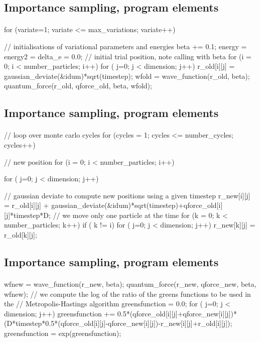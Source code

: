 \documentclass[%
twoside,                 %
final,                   %
10pt]{article}
\begin{document}
\subsection{Importance sampling, program elements}

\paragraph{}
\bcppcod
 for (variate=1; variate <= max_variations; variate++){
    // initialisations of variational parameters and energies 
    beta += 0.1;  
    energy = energy2 = delta_e = 0.0;
    //  initial trial position, note calling with beta 
    for (i = 0; i < number_particles; i++) { 
      for ( j=0; j < dimension; j++) {
	r_old[i][j] = gaussian_deviate(&idum)*sqrt(timestep);
      }
    }
    wfold = wave_function(r_old, beta);
    quantum_force(r_old, qforce_old, beta, wfold);
\ecppcod


\subsection{Importance sampling, program elements}

\paragraph{}
\bcppcod
    // loop over monte carlo cycles 
    for (cycles = 1; cycles <= number_cycles; cycles++){ 
      // new position 
      for (i = 0; i < number_particles; i++) { 
	for ( j=0; j < dimension; j++) {
	  // gaussian deviate to compute new positions using a given timestep
	  r_new[i][j] = r_old[i][j] + gaussian_deviate(&idum)*sqrt(timestep)+qforce_old[i][j]*timestep*D;
//  we move only one particle  at the time
        for (k = 0; k < number_particles; k++) {
	  if ( k != i) {
	    for ( j=0; j < dimension; j++) {
	      r_new[k][j] = r_old[k][j];
	    }
	  } 
        }
\ecppcod




\subsection{Importance sampling, program elements}

\paragraph{}
\bcppcod
        wfnew = wave_function(r_new, beta); 
        quantum_force(r_new, qforce_new, beta, wfnew);
	//  we compute the log of the ratio of the greens functions to be used in the 
	//  Metropolis-Hastings algorithm
        greensfunction = 0.0;            
	for ( j=0; j < dimension; j++) {
	  greensfunction += 0.5*(qforce_old[i][j]+qforce_new[i][j])*
	    (D*timestep*0.5*(qforce_old[i][j]-qforce_new[i][j])-r_new[i][j]+r_old[i][j]);
        }
        greensfunction = exp(greensfunction);

}}}}
\end{document}
